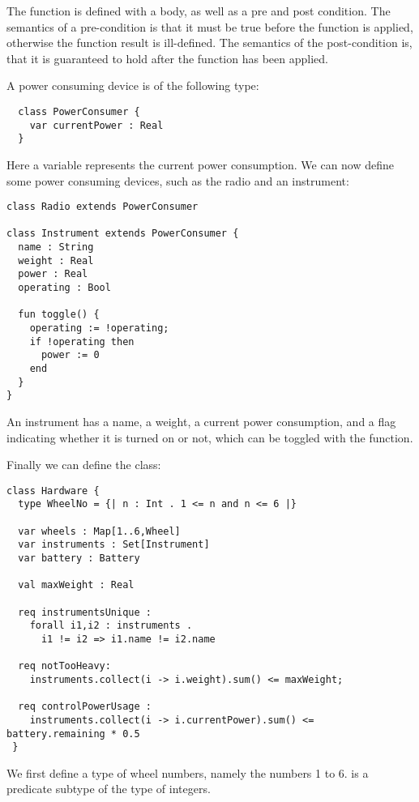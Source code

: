 \noindent
The  function is defined with a body, as well as 
a pre and post condition. The semantics of a pre-condition is
that it must be true before the function is applied, otherwise
the function result is ill-defined. The semantics of the 
post-condition is, that it is guaranteed to hold after the
function has been applied.

A power consuming device is of the following type:

\sk
\begin{lstlisting}
  class PowerConsumer {
    var currentPower : Real
  }
\end{lstlisting}

\noindent
Here a variable represents the current power consumption. We can 
now define some power consuming devices, such as the radio
and an instrument:

\sk
\begin{lstlisting}
class Radio extends PowerConsumer

class Instrument extends PowerConsumer {
  name : String
  weight : Real
  power : Real
  operating : Bool

  fun toggle() {
    operating := !operating;
    if !operating then
      power := 0
    end
  }
}
\end{lstlisting}

\noindent
An instrument has a name, a weight, a current power consumption,
and a flag indicating whether it is turned on or not, which
can be toggled with the  function.

Finally we can define the  class:

\sk
\begin{lstlisting}
class Hardware {
  type WheelNo = {| n : Int . 1 <= n and n <= 6 |}

  var wheels : Map[1..6,Wheel]
  var instruments : Set[Instrument]
  var battery : Battery

  val maxWeight : Real

  req instrumentsUnique :
    forall i1,i2 : instruments .
      i1 != i2 => i1.name != i2.name

  req notTooHeavy:
    instruments.collect(i -> i.weight).sum() <= maxWeight;

  req controlPowerUsage :
    instruments.collect(i -> i.currentPower).sum() <= battery.remaining * 0.5
 }
\end{lstlisting}

\noindent
We first define a type  of wheel numbers, namely the
numbers 1 to 6.  is a predicate subtype of the type  of integers. 

